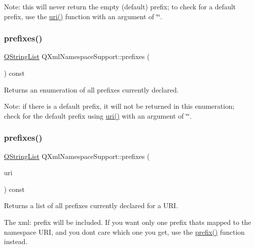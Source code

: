 Note\+: this will never return the empty (default) prefix; to check for a default prefix, use the \mbox{\hyperlink{class_q_xml_namespace_support_a6c16aac98314cd385f6442308482ce1b}{uri()}} function with an argument of \char`\"{}\char`\"{}. \mbox{\label{class_q_xml_namespace_support_a502bb683754cbb33cbd4ea53283e6f79}} 
\subsubsection{\texorpdfstring{prefixes()}{prefixes()}\hspace{0.1cm}{\footnotesize\ttfamily [1/2]}}
{\footnotesize\ttfamily \mbox{\hyperlink{class_q_string_list}{Q\+String\+List}} Q\+Xml\+Namespace\+Support\+::prefixes (\begin{DoxyParamCaption}{ }\end{DoxyParamCaption}) const}

Returns an enumeration of all prefixes currently declared.

Note\+: if there is a default prefix, it will not be returned in this enumeration; check for the default prefix using \mbox{\hyperlink{class_q_xml_namespace_support_a6c16aac98314cd385f6442308482ce1b}{uri()}} with an argument of \char`\"{}\char`\"{}. \mbox{\label{class_q_xml_namespace_support_a09a2fcb07f715049c35dd6176dd8f6b8}} 
\subsubsection{\texorpdfstring{prefixes()}{prefixes()}\hspace{0.1cm}{\footnotesize\ttfamily [2/2]}}
{\footnotesize\ttfamily \mbox{\hyperlink{class_q_string_list}{Q\+String\+List}} Q\+Xml\+Namespace\+Support\+::prefixes (\begin{DoxyParamCaption}\item[{const \mbox{\hyperlink{class_q_string}{Q\+String}} \&}]{uri }\end{DoxyParamCaption}) const}

Returns a list of all prefixes currently declared for a U\+RI.

The xml\+: prefix will be included. If you want only one prefix that\textquotesingle{}s mapped to the namespace U\+RI, and you don\textquotesingle{}t care which one you get, use the \mbox{\hyperlink{class_q_xml_namespace_support_a3799ab420cf2a762eb74929fdf5707e5}{prefix()}} function instead.

